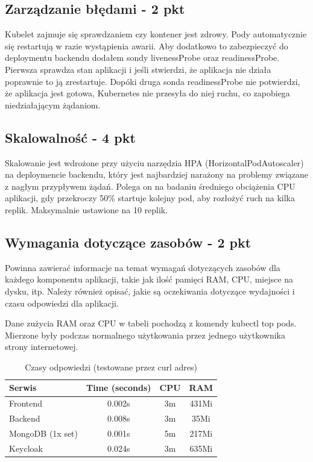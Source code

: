 \documentclass[12pt,a4paper]{article}
\begin{document}
\subsection{Zarządzanie błędami - 2 pkt}
\label{sec:ERD} 
Kubelet zajmuje się sprawdzaniem czy kontener jest zdrowy. 
Pody automatycznie się restartują w razie wystąpienia awarii. Aby dodatkowo to zabezpieczyć do deploymentu backendu dodałem sondy livenessProbe oraz readinessProbe. Pierwsza sprawdza stan aplikacji i jeśli stwierdzi, że aplikacja nie działa poprawnie to ją zrestartuje. Dopóki druga sonda readinessProbe nie potwierdzi, że aplikacja jest gotowa, Kubernetes nie przesyła do niej ruchu, co zapobiega niedziałającym żądaniom.

\subsection{Skalowalność - 4 pkt}
\label{sec:ExamplesSection}

Skalowanie jest wdrożone przy użyciu narzędzia HPA (HorizontalPodAutoscaler) na deploymencie backendu, który jest najbardziej narażony na problemy związane z nagłym przypływem żądań. Polega on na badaniu średniego obciążenia CPU aplikacji, gdy przekroczy 50\% startuje kolejny pod, aby rozłożyć ruch na kilka replik. Maksymalnie ustawione na 10 replik.

\subsection{Wymagania dotyczące zasobów - 2 pkt}
\label{sec:ExampleTables}

Powinna zawierać informacje na temat wymagań dotyczących zasobów dla każdego komponentu aplikacji, takie jak ilość pamięci RAM, CPU, miejsce na dysku, itp. Należy również opisać, jakie są oczekiwania dotyczące wydajności i czasu odpowiedzi dla aplikacji.

Dane zużycia RAM oraz CPU w tabeli pochodzą z komendy kubectl top pods. Mierzone były podczas normalnego użytkowania przez jednego użytkownika strony internetowej. 

\begin{table}[H]
    \centering
    \begin{tabular}{|l|c|c|c|}
        \hline
        \textbf{Serwis} & \textbf{Time (seconds)} & \textbf{CPU}& \textbf{RAM} \\
        \hline
        Frontend & 0.002s  & 3m & 431Mi\\ 
        \hline
        Backend & 0.008s & 3m & 35Mi\\
        \hline
        MongoDB (1x set) & 0.001s & 5m & 217Mi\\
        \hline
        Keycloak & 0.024s & 3m & 635Mi \\
        \hline
    \end{tabular}
    \caption{Czasy odpowiedzi (testowane przez curl adres)}
    \label{tab:component-times}
\end{table}
\end{document}
